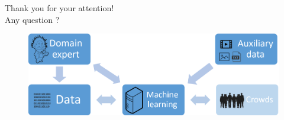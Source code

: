 \documentclass{beamer}
\begin{document}
\begin{frame}
	\begin{center}
	
		Thank you for your attention! \\ 
		Any question ? 
		
	\end{center}
	\vfill
	\begin{figure}
		\includegraphics[scale=0.30]{images/ml_expert_crowds_aux_uni.png}
	\end{figure}
	\vfill
\end{frame}
\end{document}
